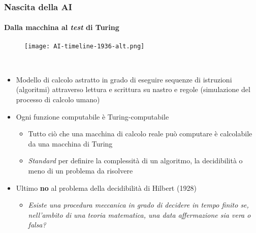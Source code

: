 %
\begin{frame}[t,fragile] \frametitle{Nascita della AI}
	{\scriptsize
		\onslide<1->
            \framesubtitle{Dalla macchina al \textit{test} di Turing}
            \vspace*{-15pt}
            \begin{minipage}[t]{\textwidth}
             	\begin{figure}[ht]
                    \centering
                    \texttt{[image: AI-timeline-1936-alt.png]}
                \end{figure}
            \end{minipage}
            \\\vspace*{3pt}
	    	\begin{minipage}[t]{\textwidth}
				\begin{minipage}[t]{0.6\textwidth}
	    			\begin{itemize}[leftmargin=10pt,align=right]
						\onslide<2->\item[\alert{\faHandORight}] Modello di calcolo astratto in grado di eseguire sequenze di istruzioni (\alert{algoritmi}) attraverso lettura e scrittura su nastro e regole (simulazione del processo di calcolo umano)
						\onslide<3->\item[\alert{\faHandORight}] Ogni funzione computabile è Turing-computabile
                    	\onslide<4->\begin{itemize}[leftmargin=10pt,align=right]
							\item[\alert{\faHandORight}] Tutto ciò che una macchina di calcolo reale può computare è calcolabile da una macchina di Turing
							\item[\alert{\faHandORight}] \textit{Standard} per definire la complessità di un algoritmo, la decidibilità o meno di un problema da risolvere
						\end{itemize}
                    	\item[\alert{\faHandORight}] Ultimo \alert{\textbf{no}} al \alert{problema della decidibilità} di Hilbert (1928)
						\begin{itemize}[leftmargin=10pt,align=right]
							\item[\alert{\faHandORight}] \textit{Esiste una procedura meccanica in grado di decidere in tempo finito se, nell'ambito di una teoria matematica, una data affermazione sia vera o falsa?}
						\end{itemize}
					\end{itemize}

\end{minipage}
\end{minipage}}
\end{frame}

